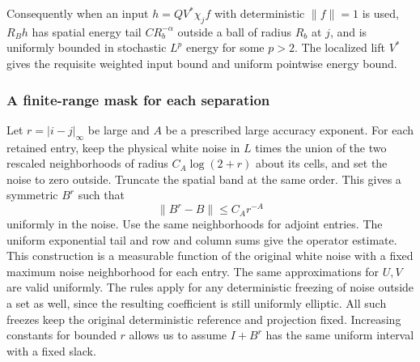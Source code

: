 \documentclass[11pt]{article}
\begin{document}
Consequently when an input \(h=Q V^*\chi_j f\) with deterministic \(\|f\|=1\) is used, \(R_B h\) has spatial energy tail \(C R^{-\alpha}_b\) outside a ball of radius \(R_b\) at \(j\), and is uniformly bounded in stochastic \(L^p\) energy for some \(p>2\). The localized lift \(V^*\) gives the requisite weighted input bound and uniform pointwise energy bound.

\subsubsection{A finite-range mask for each separation}\label{a-finite-range-mask-for-each-separation}

Let \(r=|i-j|_\infty\) be large and \(A\) be a prescribed large accuracy exponent. For each retained entry, keep the physical white noise in \(L\) times the union of the two rescaled neighborhoods of radius \(C_A\log(2+r)\) about its cells, and set the noise to zero outside. Truncate the spatial band at the same order. This gives a symmetric \(B^r\) such that \[
\|B^r-B\|\le C_A r^{-A}
\] uniformly in the noise. Use the same neighborhoods for adjoint entries. The uniform exponential tail and row and column sums give the operator estimate. This construction is a measurable function of the original white noise with a fixed maximum noise neighborhood for each entry. The same approximations for \(U,V\) are valid uniformly. The rules apply for any deterministic freezing of noise outside a set as well, since the resulting coefficient is still uniformly elliptic. All such freezes keep the original deterministic reference and projection fixed. Increasing constants for bounded \(r\) allows us to assume \(I+B^r\) has the same uniform interval with a fixed slack.
\end{document}
